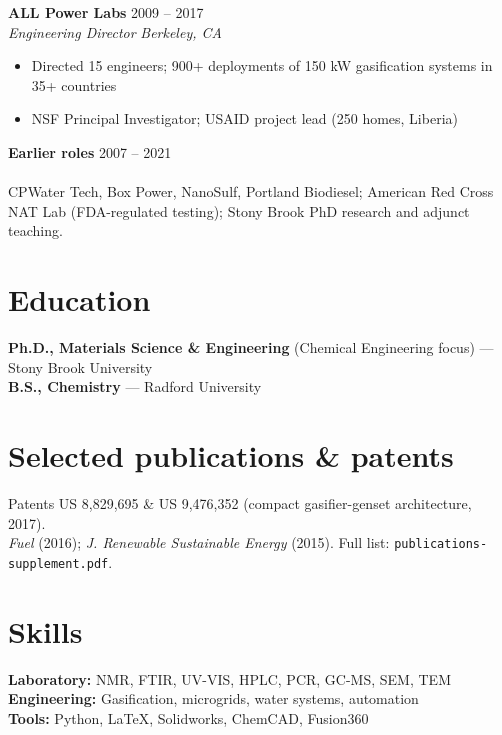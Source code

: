 \documentclass[11pt,letterpaper]{article}
\newcommand{\role}[4]{%
  \textbf{#1} \hfill #2\\
  \textit{#3} \hfill \textit{#4}\\[-2pt]
}
\begin{document}
\role{ALL Power Labs}{2009 -- 2017}{Engineering Director}{Berkeley, CA}
\begin{itemize}[nosep, leftmargin=*]
  \item Directed 15 engineers; 900+ deployments of 150 kW gasification systems in 35+ countries
  \item NSF Principal Investigator; USAID project lead (250 homes, Liberia)
\end{itemize}

\role{Earlier roles}{2007 -- 2021}{}{}
CPWater Tech, Box Power, NanoSulf, Portland Biodiesel; American Red Cross NAT Lab (FDA-regulated testing); Stony Brook PhD research and adjunct teaching.

\section{Education}

\textbf{Ph.D., Materials Science \& Engineering} (Chemical Engineering focus) --- Stony Brook University\\
\textbf{B.S., Chemistry} --- Radford University

\section{Selected publications \& patents}

Patents US 8,829,695 \& US 9,476,352 (compact gasifier-genset architecture, 2017).\\
\textit{Fuel} (2016); \textit{J. Renewable Sustainable Energy} (2015). Full list: \texttt{publications-supplement.pdf}.

\section{Skills}

\textbf{Laboratory:} NMR, FTIR, UV-VIS, HPLC, PCR, GC-MS, SEM, TEM\\
\textbf{Engineering:} Gasification, microgrids, water systems, automation\\
\textbf{Tools:} Python, \LaTeX, Solidworks, ChemCAD, Fusion360
\end{document}

